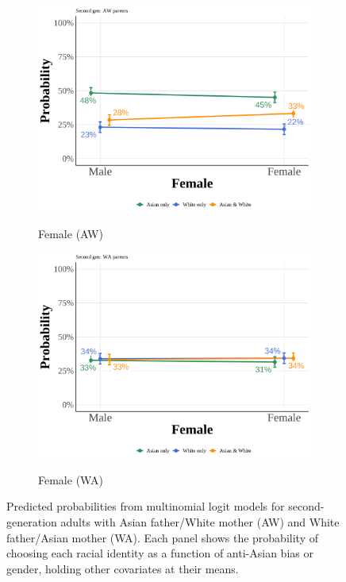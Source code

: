 \begin{center}
\begin{figure}[!htb]
\vspace{0.5cm}

\begin{subfigure}{.48\textwidth}
\caption{Female (AW)}
\centering
\includegraphics[width=1\linewidth]{pp_second_aw_Female_simple.png}\label{subfig:pp-secgen-aw-female}
\end{subfigure}
\hfill
\begin{subfigure}{.48\textwidth}
\caption{Female (WA)}
\centering
\includegraphics[width=1\linewidth]{pp_second_wa_Female_simple.png}\label{subfig:pp-secgen-wa-female}
\end{subfigure}

\caption*{\footnotesize{Predicted probabilities from multinomial logit models for second-generation adults with Asian father/White mother (AW) and White father/Asian mother (WA). Each panel shows the probability of choosing each racial identity as a function of anti-Asian bias or gender, holding other covariates at their means.}}
\end{figure}
\end{center}

